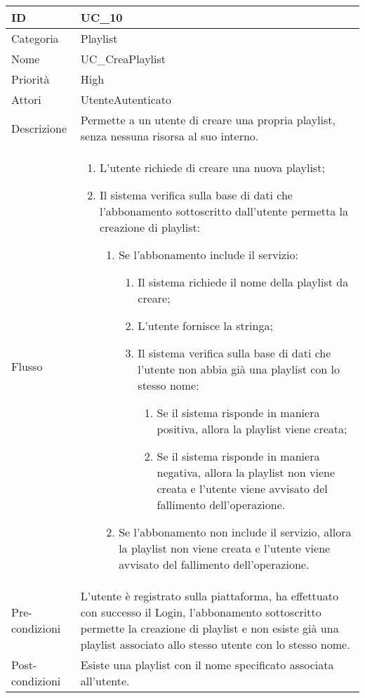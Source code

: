 \begin{center}
\begin{tabular}{ |p{2cm}|p{13cm}|  }
\hline
ID & UC\_10 \\\hline
Categoria & Playlist\\\hline
Nome & UC\_CreaPlaylist\\\hline
Priorità & High \\\hline
Attori &  UtenteAutenticato \\\hline
Descrizione & Permette a un utente di creare una propria playlist, senza nessuna risorsa al suo interno.\\\hline
Flusso &  	\begin{enumerate}
			\item L'utente richiede di creare una nuova playlist;
			\item Il sistema verifica sulla base di dati che l'abbonamento sottoscritto dall'utente permetta la creazione di playlist:
			\begin{enumerate}
				\item Se l'abbonamento include il servizio:
				\begin{enumerate}
					\item Il sistema richiede il nome della playlist da creare;
					\item L'utente fornisce la stringa;
					\item Il sistema verifica sulla base di dati che l'utente non abbia già una playlist con lo stesso nome:
					\begin{enumerate}
						\item Se il sistema risponde in maniera positiva, allora la playlist viene creata;
						\item Se il sistema risponde in maniera negativa, allora la playlist non viene creata e l'utente viene avvisato del fallimento dell'operazione.
					\end{enumerate}
				\end{enumerate}
				\item Se l'abbonamento non include il servizio, allora la playlist non viene creata e l'utente viene avvisato del fallimento dell'operazione.
			\end{enumerate}
		\end{enumerate}\\\hline
Pre-condizioni & L'utente è registrato sulla piattaforma, ha effettuato con successo il Login,  l'abbonamento sottoscritto permette la creazione di playlist e non esiste già una playlist associato allo stesso utente con lo stesso nome.\\\hline
Post-condizioni & Esiste una playlist con il nome specificato associata all'utente.\\\hline
\end{tabular}
\label{table_use_case:10}\newline


\end{center}
